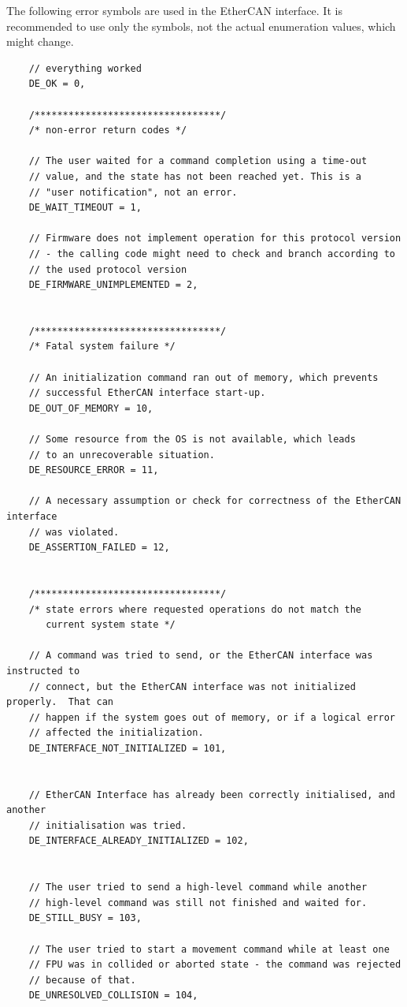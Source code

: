 \documentclass[11pt,a4paper]{report}
\begin{document}
The following error symbols are used in the EtherCAN interface.  It is recommended
to use only the symbols, not the actual enumeration values, which
might change.


\begin{verbatim}
    // everything worked
    DE_OK = 0,

    /*********************************/
    /* non-error return codes */

    // The user waited for a command completion using a time-out
    // value, and the state has not been reached yet. This is a
    // "user notification", not an error.
    DE_WAIT_TIMEOUT = 1,

    // Firmware does not implement operation for this protocol version
    // - the calling code might need to check and branch according to
    // the used protocol version
    DE_FIRMWARE_UNIMPLEMENTED = 2,


    /*********************************/
    /* Fatal system failure */

    // An initialization command ran out of memory, which prevents
    // successful EtherCAN interface start-up.
    DE_OUT_OF_MEMORY = 10,

    // Some resource from the OS is not available, which leads
    // to an unrecoverable situation.
    DE_RESOURCE_ERROR = 11,

    // A necessary assumption or check for correctness of the EtherCAN interface
    // was violated.
    DE_ASSERTION_FAILED = 12,


    /*********************************/
    /* state errors where requested operations do not match the
       current system state */

    // A command was tried to send, or the EtherCAN interface was instructed to
    // connect, but the EtherCAN interface was not initialized properly.  That can
    // happen if the system goes out of memory, or if a logical error
    // affected the initialization.
    DE_INTERFACE_NOT_INITIALIZED = 101,


    // EtherCAN Interface has already been correctly initialised, and another
    // initialisation was tried.
    DE_INTERFACE_ALREADY_INITIALIZED = 102,


    // The user tried to send a high-level command while another
    // high-level command was still not finished and waited for.
    DE_STILL_BUSY = 103,

    // The user tried to start a movement command while at least one
    // FPU was in collided or aborted state - the command was rejected
    // because of that.
    DE_UNRESOLVED_COLLISION = 104,


\end{verbatim}
\end{document}
